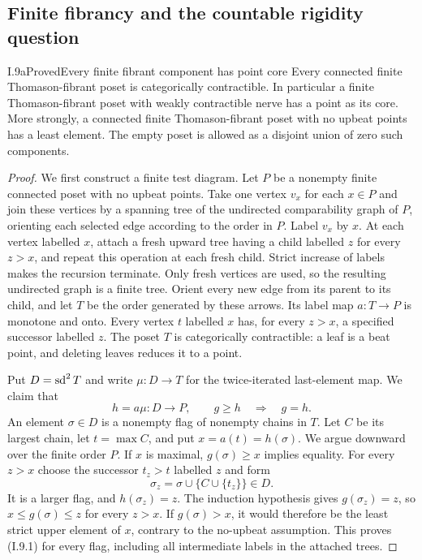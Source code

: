 \subsection{Finite fibrancy and the countable rigidity question}
\begin{claim}{I.9a}{Proved}{Every finite fibrant component has point core}
Every connected finite Thomason-fibrant poset is categorically
contractible. In particular a finite Thomason-fibrant poset with weakly
contractible nerve has a point as its core. More strongly, a connected
finite Thomason-fibrant poset with no upbeat points has a least element.
The empty poset is allowed as a disjoint union of zero such components.
\end{claim}
\begin{proof}
We first construct a finite test diagram. Let $P$ be a nonempty finite
connected poset with no upbeat points. Take one vertex $v_x$ for each
$x\in P$ and join these vertices by a spanning tree of the undirected
comparability graph of $P$, orienting each selected edge according
to the order in $P$. Label $v_x$ by $x$. At each vertex labelled $x$,
attach a fresh upward tree having a child labelled $z$ for every
$z>x$, and repeat this operation at each fresh child. Strict increase
of labels makes the recursion terminate. Only fresh vertices are used,
so the resulting undirected graph is a finite tree. Orient every new
edge from its parent to its child, and let $T$ be the order generated
by these arrows. Its label map $a:T\to P$ is monotone and onto.
Every vertex $t$ labelled $x$ has, for every $z>x$, a specified
successor labelled $z$. The poset $T$ is categorically contractible:
a leaf is a beat point, and deleting leaves reduces it to a point.

Put $D=\operatorname{sd}^2T$ and write
$\mu:D\to T$ for the twice-iterated last-element map. We claim that
\[
 h=a\mu:D\to P,\qquad g\geq h\quad\Longrightarrow\quad g=h.
 \tag{I.9.1}
\]
An element $\sigma\in D$ is a nonempty flag of nonempty chains in
$T$. Let $C$ be its largest chain, let $t=\max C$, and put
$x=a(t)=h(\sigma)$. We argue downward over the finite order $P$.
If $x$ is maximal, $g(\sigma)\geq x$ implies equality.
For every $z>x$ choose the successor $t_z>t$ labelled $z$ and form
\[
 \sigma_z=\sigma\cup\{C\cup\{t_z\}\}\in D.
\]
It is a larger flag, and $h(\sigma_z)=z$. The induction hypothesis
gives $g(\sigma_z)=z$, so
$x\leq g(\sigma)\leq z$ for every $z>x$.
If $g(\sigma)>x$, it would therefore be the least strict upper
element of $x$, contrary to the no-upbeat assumption. This proves
(I.9.1) for every flag, including all intermediate labels in the
attached trees.


\end{proof}
